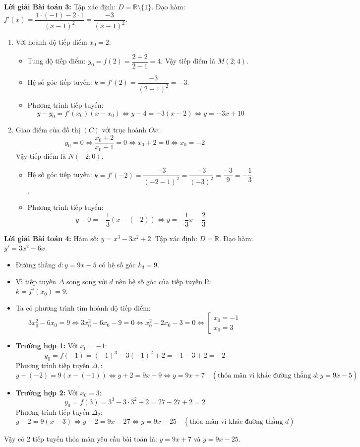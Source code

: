 \documentclass[12pt, a4paper]{article}
\begin{document}
\textbf{Lời giải Bài toán 3:}
Tập xác định: $D = \mathbb{R} \setminus \{1\}$.
Đạo hàm: $f'(x) = \dfrac{1 \cdot (-1) - 2 \cdot 1}{(x - 1)^2} = \dfrac{-3}{(x - 1)^2}$.
\begin{enumerate}[label=\alph*)]
    \item Với hoành độ tiếp điểm $x_0 = 2$:
    \begin{itemize}
        \item Tung độ tiếp điểm: $y_0 = f(2) = \dfrac{2 + 2}{2 - 1} = 4$. Vậy tiếp điểm là $M(2; 4)$.
        \item Hệ số góc tiếp tuyến: $k = f'(2) = \dfrac{-3}{(2 - 1)^2} = -3$.
        \item Phương trình tiếp tuyến:
        $$y - y_0 = f'(x_0)(x - x_0) \iff y - 4 = -3(x - 2) \iff y = -3x + 10$$
    \end{itemize}

    \item Giao điểm của đồ thị $(C)$ với trục hoành $Ox$:
    $$y_0 = 0 \iff \dfrac{x_0 + 2}{x_0 - 1} = 0 \iff x_0 + 2 = 0 \iff x_0 = -2$$
    Vậy tiếp điểm là $N(-2; 0)$.
    \begin{itemize}
        \item Hệ số góc tiếp tuyến: $k = f'(-2) = \dfrac{-3}{(-2 - 1)^2} = \dfrac{-3}{(-3)^2} = \dfrac{-3}{9} = -\dfrac{1}{3}$.
        \item Phương trình tiếp tuyến:
        $$y - 0 = -\dfrac{1}{3}(x - (-2)) \iff y = -\dfrac{1}{3}x - \dfrac{2}{3}$$
    \end{itemize}
\end{enumerate}

\textbf{Lời giải Bài toán 4:}
Hàm số: $y = x^3 - 3x^2 + 2$. Tập xác định: $D = \mathbb{R}$.
Đạo hàm: $y' = 3x^2 - 6x$.
\begin{itemize}
    \item Đường thẳng $d: y = 9x - 5$ có hệ số góc $k_d = 9$.
    \item Vì tiếp tuyến $\Delta$ song song với $d$ nên hệ số góc của tiếp tuyến là: $k = f'(x_0) = 9$.
    \item Ta có phương trình tìm hoành độ tiếp điểm:
    $$3x_0^2 - 6x_0 = 9 \iff 3x_0^2 - 6x_0 - 9 = 0 \iff x_0^2 - 2x_0 - 3 = 0 \iff \left[\begin{array}{l} x_0 = -1 \\ x_0 = 3 \end{array}\right.$$
    \item \textbf{Trường hợp 1:} Với $x_0 = -1$:
    $$y_0 = f(-1) = (-1)^3 - 3(-1)^2 + 2 = -1 - 3 + 2 = -2$$
    Phương trình tiếp tuyến $\Delta_1$:
    $$y - (-2) = 9(x - (-1)) \iff y + 2 = 9x + 9 \iff y = 9x + 7 \quad (\text{thỏa mãn vì khác đường thẳng } d: y = 9x - 5)$$
    \item \textbf{Trường hợp 2:} Với $x_0 = 3$:
    $$y_0 = f(3) = 3^3 - 3 \cdot 3^2 + 2 = 27 - 27 + 2 = 2$$
    Phương trình tiếp tuyến $\Delta_2$:
    $$y - 2 = 9(x - 3) \iff y - 2 = 9x - 27 \iff y = 9x - 25 \quad (\text{thỏa mãn vì khác đường thẳng } d)$$
\end{itemize}
Vậy có 2 tiếp tuyến thỏa mãn yêu cầu bài toán là: $y = 9x + 7$ và $y = 9x - 25$.
\end{document}
